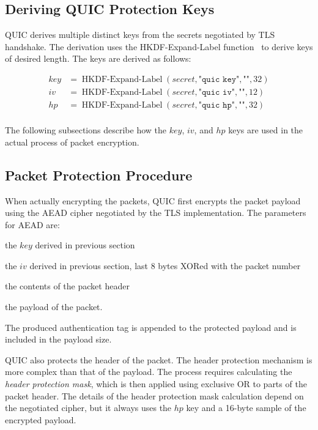 \subsection{Deriving QUIC Protection Keys}

QUIC derives multiple distinct keys from the secrets negotiated by TLS handshake. The derivation
uses the HKDF-Expand-Label function~\cite{rfc5869} to derive keys of desired length. The keys are
derived as follows:

\begin{equation*}
  \begin{split}
  key & = \operatorname{HKDF-Expand-Label}(secret, \texttt{"quic key"}, \texttt{""}, 32) \\
  iv  & = \operatorname{HKDF-Expand-Label}(secret, \texttt{"quic iv"}, \texttt{""}, 12)  \\
  hp  & = \operatorname{HKDF-Expand-Label}(secret, \texttt{"quic hp"}, \texttt{""}, 32)  \\
  \end{split}
\end{equation*}

The following subsections describe how the $key$, $iv$, and $hp$ keys are used in the actual process
of packet encryption.

\subsection{Packet Protection Procedure}

When actually encrypting the packets, QUIC first encrypts the packet payload using the AEAD cipher
negotiated by the TLS implementation. The parameters for AEAD are:

\begin{itemize}

     the $key$ derived in previous section

     the $iv$ derived in previous section, last 8 bytes XORed with the packet number

     the contents of the packet header

     the payload of the packet.

\end{itemize}

The produced authentication tag is appended to the protected payload and is included in the payload
size.

QUIC also protects the header of the packet. The header protection mechanism is more complex than
that of the payload. The process requires calculating the \textit{header protection mask}, which is
then applied using exclusive OR to parts of the packet header. The details of the header protection
mask calculation depend on the negotiated cipher, but it always uses the $hp$ key and a 16-byte
sample of the encrypted payload.

